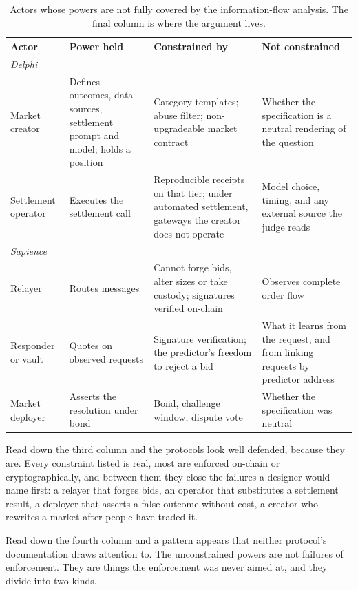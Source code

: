 \begin{table}[htbp]
\centering
\small
\begin{tabularx}{\textwidth}{p{}p{}p{}X}
\toprule
\textbf{Actor} & \textbf{Power held} & \textbf{Constrained by} & \textbf{Not constrained} \\
\midrule
\multicolumn{4}{l}{\emph{Delphi}} \\
Market creator & Defines outcomes, data sources, settlement prompt and model; holds a position & Category templates; abuse filter; non-upgradeable market contract & Whether the specification is a neutral rendering of the question \\
Settlement operator & Executes the settlement call & Reproducible receipts on that tier; under automated settlement, gateways the creator does not operate & Model choice, timing, and any external source the judge reads \\
\midrule
\multicolumn{4}{l}{\emph{Sapience}} \\
Relayer & Routes messages & Cannot forge bids, alter sizes or take custody; signatures verified on-chain & Observes complete order flow \\
Responder or vault & Quotes on observed requests & Signature verification; the predictor's freedom to reject a bid & What it learns from the request, and from linking requests by predictor address \\
Market deployer & Asserts the resolution under bond & Bond, challenge window, dispute vote & Whether the specification was neutral \\
\bottomrule
\end{tabularx}
\caption{Actors whose powers are not fully covered by the information-flow analysis. The
final column is where the argument lives.}
\label{tab:threat}
\end{table}

Read down the third column and the protocols look well defended, because they are. Every
constraint listed is real, most are enforced on-chain or cryptographically, and between them
they close the failures a designer would name first: a relayer that forges bids, an operator
that substitutes a settlement result, a deployer that asserts a false outcome without cost,
a creator who rewrites a market after people have traded it.

Read down the fourth column and a pattern appears that neither protocol's documentation
draws attention to. The unconstrained powers are not failures of enforcement. They are
things the enforcement was never aimed at, and they divide into two kinds.

